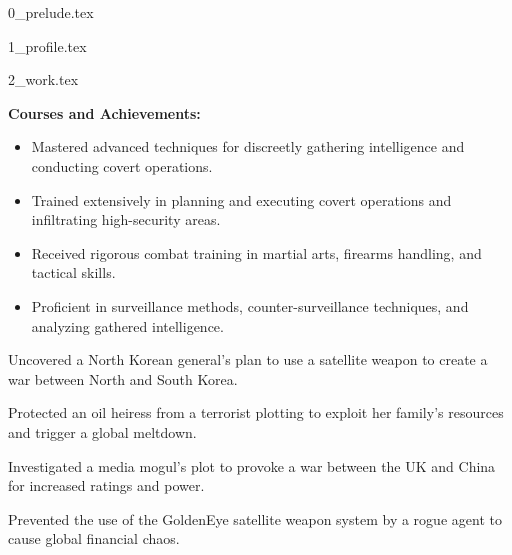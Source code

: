 \documentclass{article}
\begin{document}
{0_prelude.tex}

{1_profile.tex}

{2_work.tex}



\begin{cvevent}[1958][1962]
    \textbf{Courses and Achievements:}
    \begin{itemize}
        \item Mastered advanced techniques for discreetly gathering intelligence and conducting covert operations.
        \item Trained extensively in planning and executing covert operations and infiltrating high-security areas.
        \item Received rigorous combat training in martial arts, firearms handling, and tactical skills.
        \item Proficient in surveillance methods, counter-surveillance techniques, and analyzing gathered intelligence.
    \end{itemize}
\end{cvevent}



\begin{cvevent}[2002]
    Uncovered a North Korean general's plan to use a satellite weapon to create a war between North and South Korea.
\end{cvevent}

\cvseparator[2]
\begin{cvevent}[1999]
    Protected an oil heiress from a terrorist plotting to exploit her family's resources and trigger a global meltdown.
\end{cvevent}

\cvseparator[2]
\begin{cvevent}[1997]
    Investigated a media mogul's plot to provoke a war between the UK and China for increased ratings and power.
\end{cvevent}

\cvseparator[2]
\begin{cvevent}[1995]
    Prevented the use of the GoldenEye satellite weapon system by a rogue agent to cause global financial chaos.
\end{cvevent}
\end{document}
